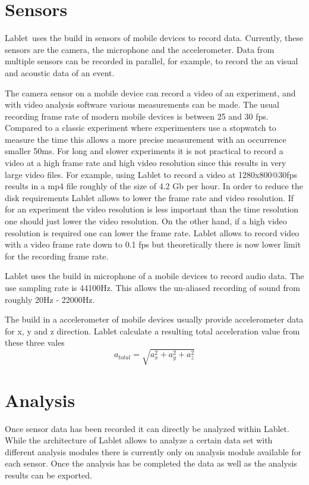 \documentclass{sigchi}
\newcommand{\lablet}{Lablet\ }
\begin{document}
\section{Sensors}
\lablet uses the build in sensors of mobile devices to record data.
Currently, these sensors are the camera, the microphone and the accelerometer.
Data from multiple sensors can be recorded in parallel, for example, to record the an visual and acoustic data of an event.

The camera sensor on a mobile device can record a video of an experiment, and with video analysis software various measurements can be made.
  The usual recording frame rate of modern mobile devices
is between 25 and 30 fps.  Compared to a classic experiment where
experimenters use a stopwatch to measure the time this allows a more
precise measurement with an occurrence smaller 50ms.  For long and
slower experiments it is not practical to record a video at a high
frame rate and high video resolution since this results in very large
video files.  For example, using Lablet to record a video at
1280x800@30fps results in a mp4 file roughly of the size of 4.2 Gb per
hour.  In order to reduce the disk requirements Lablet allows to lower
the frame rate and video resolution.  If for an experiment the video
resolution is less important than the time resolution one should just
lower the video resolution.  On the other hand, if a high video
resolution is required one can lower the frame rate.  Lablet allows to
record video with a video frame rate down to 0.1 fps but theoretically
there is now lower limit for the recording frame rate.

Lablet uses the build in microphone of a mobile devices to record
audio data.
The use sampling rate is 44100Hz.
This allows the un-aliased recording of sound from roughly 20Hz - 22000Hz.

The build in a accelerometer of mobile devices usually provide
accelerometer data for x, y and z direction.
Lablet calculate a resulting total acceleration value from these three
vales
\[
a_{total} = \sqrt{a_x^2 + a_y^2 + a_z^2}
\]

\section{Analysis}
Once sensor data has been recorded it can directly be analyzed within
Lablet.  While the architecture of Lablet allows to analyze a certain
data set with different analysis modules there is currently only on
analysis module available for each sensor.  Once the analysis has be
completed the data as well as the analysis results can be exported.
\end{document}
